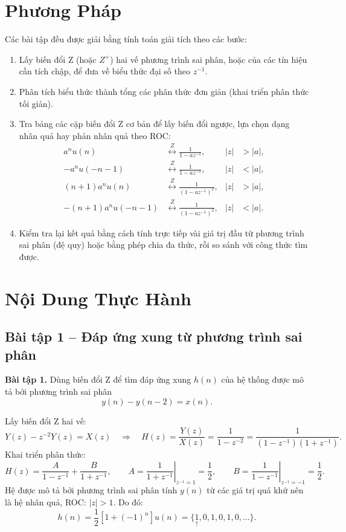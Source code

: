 \documentclass[12pt,a4paper]{article}
\newcommand{\org}[1]{\underset{\uparrow}{#1}}
\newcommand{\zpair}{\overset{Z}{\longleftrightarrow}}
\begin{document}
\section{Phương Pháp}
Các bài tập đều được giải bằng tính toán giải tích theo các bước:
\begin{enumerate}
    \item Lấy biến đổi Z (hoặc $Z^+$) hai vế phương trình sai phân, hoặc của các tín hiệu cần tích chập, để đưa về biểu thức đại số theo $z^{-1}$.
    \item Phân tích biểu thức thành tổng các phân thức đơn giản (khai triển phân thức tối giản).
    \item Tra bảng các cặp biến đổi Z cơ bản để lấy biến đổi ngược, lựa chọn dạng nhân quả hay phản nhân quả theo ROC:
    \begin{align*}
        a^n u(n) &\zpair \frac{1}{1 - a z^{-1}}, & |z| &> |a|, \\
        -a^n u(-n-1) &\zpair \frac{1}{1 - a z^{-1}}, & |z| &< |a|, \\
        (n+1) a^n u(n) &\zpair \frac{1}{(1 - a z^{-1})^2}, & |z| &> |a|, \\
        -(n+1) a^n u(-n-1) &\zpair \frac{1}{(1 - a z^{-1})^2}, & |z| &< |a|.
    \end{align*}
    \item Kiểm tra lại kết quả bằng cách tính trực tiếp vài giá trị đầu từ phương trình sai phân (đệ quy) hoặc bằng phép chia đa thức, rồi so sánh với công thức tìm được.
\end{enumerate}

\section{Nội Dung Thực Hành}

\subsection{Bài tập 1 -- Đáp ứng xung từ phương trình sai phân}
\begin{mdframed}[style=exbox]
\noindent\textbf{Bài tập 1.} Dùng biến đổi Z để tìm đáp ứng xung $h(n)$ của hệ thống được mô tả bởi phương trình sai phân
\[
    y(n) - y(n-2) = x(n).
\]
\end{mdframed}

Lấy biến đổi Z hai vế:
\[
    Y(z) - z^{-2} Y(z) = X(z)
    \quad\Longrightarrow\quad
    H(z) = \frac{Y(z)}{X(z)} = \frac{1}{1 - z^{-2}} = \frac{1}{(1 - z^{-1})(1 + z^{-1})}.
\]
Khai triển phân thức:
\[
    H(z) = \frac{A}{1 - z^{-1}} + \frac{B}{1 + z^{-1}},
    \qquad
    A = \left.\frac{1}{1 + z^{-1}}\right|_{z^{-1} = 1} = \frac{1}{2},
    \qquad
    B = \left.\frac{1}{1 - z^{-1}}\right|_{z^{-1} = -1} = \frac{1}{2}.
\]
Hệ được mô tả bởi phương trình sai phân tính $y(n)$ từ các giá trị quá khứ nên là hệ nhân quả, ROC: $|z| > 1$. Do đó:
\begin{equation}
    h(n) = \frac{1}{2}\left[1 + (-1)^n\right] u(n) = \{\org{1}, 0, 1, 0, 1, 0, \dots\}.
\end{equation}
\end{document}
